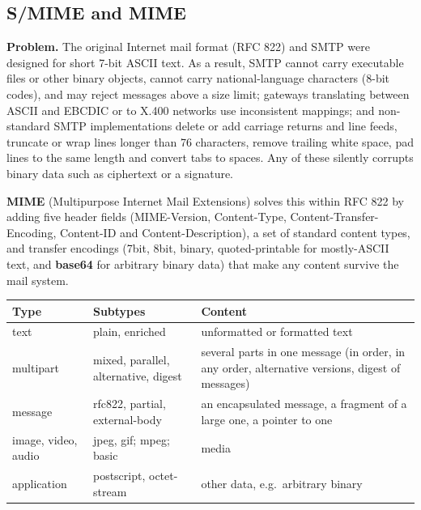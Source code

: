 \subsection{S/MIME and MIME \new}

\textbf{Problem.} The original Internet mail format (RFC 822) and SMTP were designed for short 7-bit ASCII text. As a result, SMTP cannot carry executable files or other binary objects, cannot carry national-language characters (8-bit codes), and may reject messages above a size limit; gateways translating between ASCII and EBCDIC or to X.400 networks use inconsistent mappings; and non-standard SMTP implementations delete or add carriage returns and line feeds, truncate or wrap lines longer than 76 characters, remove trailing white space, pad lines to the same length and convert tabs to spaces. Any of these silently corrupts binary data such as ciphertext or a signature.

\textbf{MIME} (Multipurpose Internet Mail Extensions) solves this within RFC 822 by adding five header fields (MIME-Version, Content-Type, Content-Transfer-Encoding, Content-ID and Content-Description), a set of standard content types, and transfer encodings (7bit, 8bit, binary, quoted-printable for mostly-ASCII text, and \textbf{base64} for arbitrary binary data) that make any content survive the mail system.
\begin{center}\small
\begin{tabularx}{\textwidth}{@{}l l >{\raggedright\arraybackslash}X@{}}
\toprule
Type & Subtypes & Content\\
\midrule
text & plain, enriched & unformatted or formatted text\\
multipart & mixed, parallel, alternative, digest & several parts in one message (in order, in any order, alternative versions, digest of messages)\\
message & rfc822, partial, external-body & an encapsulated message, a fragment of a large one, a pointer to one\\
image, video, audio & jpeg, gif; mpeg; basic & media\\
application & postscript, octet-stream & other data, e.g.\ arbitrary binary\\
\bottomrule
\end{tabularx}
\end{center}

